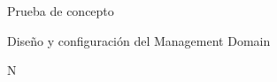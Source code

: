 \begin{section}{Prueba de concepto}
\begin{subsection}{Diseño y configuración del Management Domain}
    
    N
    

\end{subsection}
\end{section}
